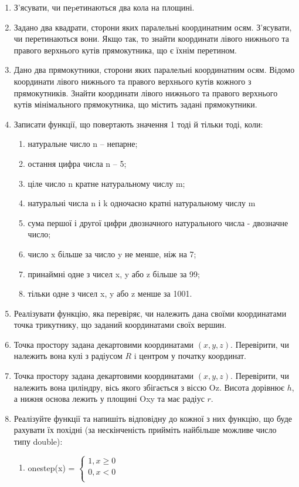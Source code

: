 \documentclass[]{article}
\makeatletter
\newcommand{\xslalph}[1]{\expandafter\@xslalph\csname c@#1\endcsname}
\newcommand{\@xslalph}[1]{%
    \ifcase#1\or а\or б\or в\or г\or д\or e\or є\or ж\or з\or i%
    \or й\or к\or л\or м\or н\or о\or п\or р\or с\or т%
    \or у\or ф\or х\or ц\or ч\or ш\or ю\or я\or аа\or бб\or вв %
    \else\@ctrerr\fi%
}
\makeatother
\begin{document}
\begin{enumerate}
\item
  З'ясувати, чи пеpетинаються два кола на площині.
\item
  Задано два квадрати, сторони яких паралельні координатним осям.
  З'ясувати, чи перетинаються вони. Якщо так, то знайти координати
  лівого нижнього та правого верхнього кутів прямокутника, що є їхнім
  перетином.
\item
  Дано два прямокутники, сторони яких паралельні координатним осям.
  Відомо координати лівого нижнього та правого верхнього кутів кожного з
  прямокутників. Знайти координати лівого нижнього та правого верхнього
  кутів мінімального прямокутника, що містить задані прямокутники.
\item
  Записати функції, що повертають значення 1 тоді й тільки тоді, коли:
\begin{enumerate}[label=\xslalph*)]
\item натуральне число n -- непарне;
\item остання цифра числа n -- 5;
\item ціле число n кратне натуральному числу m;
\item натуральні числа n і k одночасно кратні натуральному числу m
\item сума першої і другої цифри двозначного натурального числа - двозначне
число;
\item число x більше за число y не менше, ніж на 7;
\item принаймні одне з чисел x, y або z більше за 99;
\item тільки одне з чисел x, y або z менше за 1001.
\end{enumerate}

\item
  Реалізувати функцію, яка перевіряє, чи належить дана своїми координатами
 точка трикутнику, що заданий координатами своїх вершин.
\item
  Точка простору задана декартовими координатами $(x, y, z)$. Перевірити,
  чи належить вона кулі з радіусом $R$ i центром у початку координат.
\item
  Точка простору задана декартовими координатами $(x, y, z)$. Перевірити,
  чи належить вона циліндру, вісь якого збігається з віссю Oz. Висота
  дорівнює $h$, а нижня основа лежить у площині Oxy та має радіус $r$.
\item
  Реалізуйте функції та напишіть відповідну до кожної з них функцію, що
  буде рахувати їх похідні (за нескінченість прийміть найбільше можливе 
число типу double):
\begin{enumerate}[label=\xslalph*)]
\item onestep(x) = \(\left\{ \begin{matrix}
1,x \geq 0 \\
0,x < 0 \\
\end{matrix} \right.\ \)


\end{enumerate}
\end{enumerate}
\end{document}
